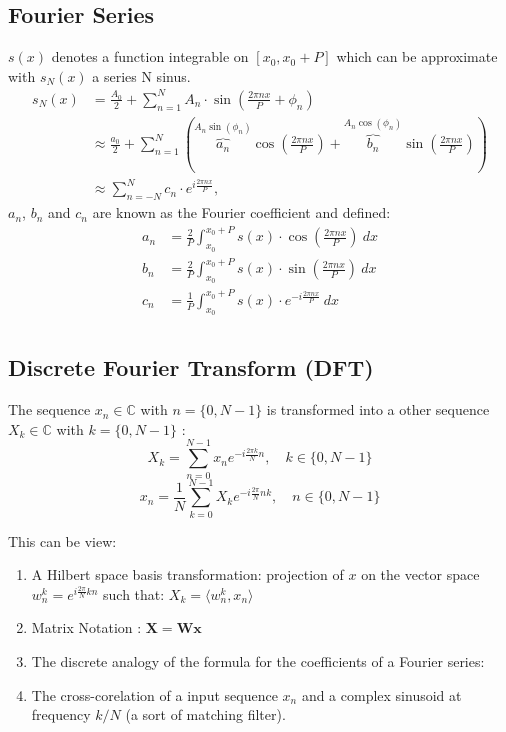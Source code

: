\documentclass[twocolumn]{article}
\numberwithin{equation}{section}
\begin{document}
	\subsection{Fourier Series}
$s(x)$ denotes a function integrable on $[x_0,x_0+P]$ which can be approximate with $s_N(x)$ a series N sinus.
\begin{align*}
s_N(x) 	&= \frac{A_0}{2} + \sum_{n=1}^N A_n\cdot \sin(\tfrac{2\pi nx}{P}+\phi_n) \\
		&\approx \frac{a_0}{2} + \sum_{n=1}^N \left(\overbrace{a_n}^{A_n \sin(\phi_n)} \cos(\tfrac{2\pi nx}{P}) + \overbrace{b_n}^{A_n \cos(\phi_n)} \sin(\tfrac{2\pi nx}{P})\right)\\
		&\approx \sum_{n=-N}^N c_n\cdot e^{i \tfrac{2\pi nx}{P}},
\end{align*}
$a_n$, $b_n$ and $c_n$ are known as the Fourier coefficient and defined:
\begin{align*}
a_n &= \frac{2}{P}\int_{x_0}^{x_0+P} s(x)\cdot  \cos(\tfrac{2\pi nx}{P})\ dx\\
b_n &= \frac{2}{P}\int_{x_0}^{x_0+P} s(x)\cdot  \sin(\tfrac{2\pi nx}{P})\ dx\\
c_n &= \frac{1}{P}\int_{x_0}^{x_0+P} s(x)\cdot e^{-i \tfrac{2\pi nx}{P}}\ dx\\
\end{align*}

	\subsection{Discrete Fourier Transform (DFT)}
\begin{framed}
The sequence $x_n \in \mathbb{C}$ with $n=\{0,N-1\}$ is transformed into a other sequence $X_k \in \mathbb{C}$ with $k=\{0,N-1\}$ :
$$ X_k = \sum_{n=0}^{N-1} x_n  e^{-i \frac{2 \pi k}{N} n},  \quad k\in \{0, N-1\}$$
$$ x_n = \frac{1}{N} \sum_{k=0}^{N-1} X_k e^{-i \frac{2 \pi }{N} nk},  \quad n\in \{0, N-1\}$$
\end{framed}
This can be view:
\begin{enumerate}
	\item A Hilbert space basis transformation: projection of $x$ on the vector space $w_n^k = e^{ i \frac{2\pi }{N} kn}$ such that: $ X_k = \langle w_n^k , x_n \rangle$
	\item Matrix Notation : $  \boldsymbol{X} = \boldsymbol{W} \boldsymbol{x}$
	\item The discrete analogy of the formula for the coefficients of a Fourier series:
	\item The cross-corelation of a input sequence $x_n$ and a complex sinusoid at frequency $k/N$ (a sort of matching filter). 
\end{enumerate} 
\end{document}
